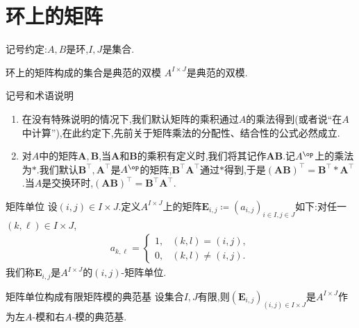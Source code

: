 \section{环上的矩阵}

记号约定:$A,B$是环,$I,J$是集合.

\begin{proposition}{环上的矩阵构成的集合是典范的双模}{}
	$A^{I\times J}$是典范的双模.
\end{proposition}

\begin{remark}{记号和术语说明}{}
	\begin{enumerate}
		\item 在没有特殊说明的情况下,我们默认矩阵的乘积通过$A$的乘法得到(或者说``在$A$中计算''),在此约定下,先前关于矩阵乘法的分配性、结合性的公式必然成立.
		\item 对$A$中的矩阵$\boldsymbol{A},\boldsymbol{B}$,当$\boldsymbol{A}$和$\boldsymbol{B}$的乘积有定义时,我们将其记作$\boldsymbol{A}\boldsymbol{B}$.记$A^{\op}$上的乘法为$\ast$.我们默认$\boldsymbol{B}^{\top},\boldsymbol{A}^{\top}$是$A^{\op}$的矩阵,$\boldsymbol{B}^{\top}\boldsymbol{A}^{\top}$通过$\ast$得到,于是$\left(\boldsymbol{A}\boldsymbol{B}\right)^{\top}=\boldsymbol{B}^{\top}\ast\boldsymbol{A}^{\top}$.当$A$是交换环时,$\left(\boldsymbol{A}\boldsymbol{B}\right)^{\top}=\boldsymbol{B}^{\top}\boldsymbol{A}^{\top}$.
	\end{enumerate}
\end{remark}

\begin{definition}{矩阵单位}{}
	设$\left(i,j\right)\in I\times J$.定义$A^{I\times J}$上的矩阵$\boldsymbol{E}_{i,j}\coloneq\left(a_{i,j}\right)_{i\in I,j\in J}$如下:对任一$\left(k,\ell\right)\in I\times J$,
	\begin{align*}
		a_{k,\ell}=
		\begin{cases}
			1,&\left(k,l\right)=\left(i,j\right),\\
			0,&\left(k,l\right)\neq\left(i,j\right).
		\end{cases}
	\end{align*}
	我们称$\boldsymbol{E}_{i,j}$是$A^{I\times J}$的$\left(i,j\right)$-矩阵单位.
\end{definition}

\begin{proposition}{矩阵单位构成有限矩阵模的典范基}{}
	设集合$I,J$有限,则$\left(\boldsymbol{E}_{i,j}\right)_{\left(i,j\right)\in I\times J}$是$A^{I\times J}$作为左$A$-模和右$A$-模的典范基.
\end{proposition}

